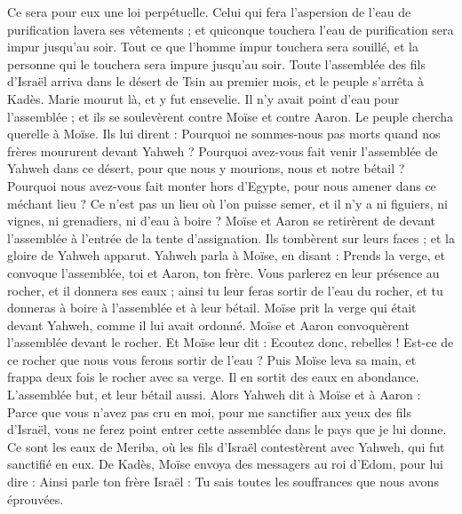 \begin{multicols}{2}
Ce sera pour eux une loi perpétuelle. Celui qui fera l’aspersion de l'eau de purification lavera ses vêtements ; et quiconque touchera l'eau de purification sera impur jusqu'au soir.
Tout ce que l'homme impur touchera sera souillé, et la personne qui le touchera sera impure jusqu'au soir.
\VerseOne{}Toute l’assemblée des fils d'Israël arriva dans le désert de Tsin au premier mois, et le peuple s’arrêta à Kadès. Marie mourut là, et y fut ensevelie.
Il n’y avait point d'eau pour l'assemblée ; et ils se soulevèrent contre Moïse et contre Aaron.
Le peuple chercha querelle à Moïse. Ils lui dirent : Pourquoi ne sommes-nous pas morts quand nos frères moururent devant Yahweh ?
Pourquoi avez-vous fait venir l'assemblée de Yahweh dans ce désert, pour que nous y mourions, nous et notre bétail ?
Pourquoi nous avez-vous fait monter hors d'Egypte, pour nous amener dans ce méchant lieu ? Ce n’est pas un lieu où l’on puisse semer, et il n’y a ni figuiers, ni vignes, ni grenadiers, ni d'eau à boire ?
Moïse et Aaron se retirèrent de devant l'assemblée à l'entrée de la tente d'assignation. Ils tombèrent sur leurs faces ; et la gloire de Yahweh apparut.
Yahweh parla à Moïse, en disant :
Prends la verge, et convoque l'assemblée, toi et Aaron, ton frère. Vous parlerez en leur présence au rocher, et il donnera ses eaux ; ainsi tu leur feras sortir de l'eau du rocher, et tu donneras à boire à l'assemblée et à leur bétail.
Moïse prit la verge qui était devant Yahweh, comme il lui avait ordonné.
Moïse et Aaron convoquèrent l'assemblée devant le rocher. Et Moïse leur dit : Ecoutez donc, rebelles ! Est-ce de ce rocher que nous vous ferons sortir de l'eau ?
Puis Moïse leva sa main, et frappa deux fois le rocher avec sa verge. Il en sortit des eaux en abondance. L'assemblée but, et leur bétail aussi.
Alors Yahweh dit à Moïse et à Aaron : Parce que vous n'avez pas cru en moi, pour me sanctifier aux yeux des fils d'Israël, vous ne ferez point entrer cette assemblée dans le pays que je lui donne.
Ce sont les eaux de Meriba, où les fils d'Israël contestèrent avec Yahweh, qui fut sanctifié en eux.
De Kadès, Moïse envoya des messagers au roi d'Edom, pour lui dire : Ainsi parle ton frère Israël : Tu sais toutes les souffrances que nous avons éprouvées.

\end{multicols}
